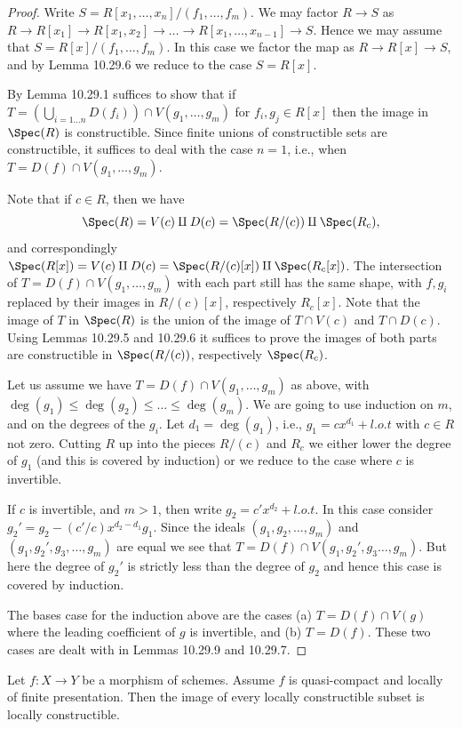 \begin{proof}
Write $S=R[x_1,\ldots,x_n]/(f_1,\ldots,f_m)$. We may factor $R\to S$ as $R\to R[x_1]\to R[x_1,x_2]\to\ldots\to R[x_1,\ldots,x_{n-1}]\to S$. Hence we may assume that $S=R[x]/(f_1,\ldots,f_m)$. In this case we factor the map as $R\to R[x]\to S$, and by Lemma 10.29.6 we reduce to the case $S=R[x]$.

By Lemma 10.29.1 suffices to show that if $T=(\bigcup_{i=1\ldots n}D(f_i))\cap V(g_1,\ldots,g_m)$ for $f_i,g_j\in R[x]$ then the image in $\Spec(R)$ is constructible. Since finite unions of constructible sets are constructible, it suffices to deal with the case $n=1$, i.e., when $T=D(f)\cap V(g_1,\ldots,g_m)$.

Note that if $c\in R$, then we have
\[\Spec(R)=V(c)\amalg D(c)=\Spec(R/(c))\amalg\Spec(R_c),\]
and correspondingly $\Spec(R[x])=V(c)\amalg D(c)=\Spec(R/(c)[x])\amalg\Spec(R_c[x])$. The intersection of $T=D(f)\cap V(g_1,\ldots,g_m)$ with each part still has the same shape, with $f,g_i$ replaced by their images in $R/(c)[x]$, respectively $R_c[x]$. Note that the image of $T$ in $\Spec(R)$ is the union of the image of $T\cap V(c)$ and $T\cap D(c)$. Using Lemmas 10.29.5 and 10.29.6 it suffices to prove the images of both parts are constructible in $\Spec(R/(c))$, respectively $\Spec(R_c)$.

Let us assume we have $T=D(f)\cap V(g_1,\ldots,g_m)$ as above, with $\deg(g_1)\leq\deg(g_2)\leq\ldots\leq\deg(g_m)$. We are going to use induction on $m$, and on the degrees of the $g_i$. Let $d_1=\deg(g_1)$, i.e., $g_1=cx^{d_1}+l.o.t$ with $c\in R$ not zero. Cutting $R$ up into the pieces $R/(c)$ and $R_c$ we either lower the degree of $g_1$ (and this is covered by induction) or we reduce to the case where $c$ is invertible.

If $c$ is invertible, and $m>1$, then write $g_2=c'x^{d_2}+l.o.t$. In this case consider $g_2'=g_2-(c'/c)x^{d_2-d_1}g_1$. Since the ideals $(g_1,g_2,\ldots,g_m)$ and $(g_1,g_2',g_3,\ldots,g_m)$ are equal we see that $T=D(f)\cap V(g_1,g_2',g_3\ldots,g_m)$. But here the degree of $g_2'$ is strictly less than the degree of $g_2$ and hence this case is covered by induction.

The bases case for the induction above are the cases (a) $T=D(f)\cap V(g)$ where the leading coefficient of $g$ is invertible, and (b) $T=D(f)$. These two cases are dealt with in Lemmas 10.29.9 and 10.29.7.
\end{proof}
\begin{theorem}
Let $f:X\to Y$ be a morphism of schemes. Assume $f$ is quasi-compact and locally of finite presentation. Then the image of every locally constructible subset is locally constructible.
\end{theorem}
